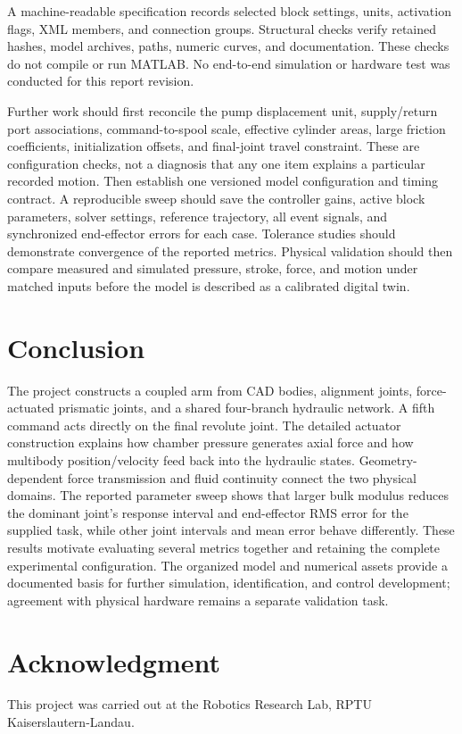 \documentclass[conference,letterpaper]{IEEEtran}
\begin{document}
A machine-readable specification records selected block settings, units, activation flags, XML members, and connection groups. Structural checks verify retained hashes, model archives, paths, numeric curves, and documentation. These checks do not compile or run MATLAB. No end-to-end simulation or hardware test was conducted for this report revision.

Further work should first reconcile the pump displacement unit, supply/return port associations, command-to-spool scale, effective cylinder areas, large friction coefficients, initialization offsets, and final-joint travel constraint. These are configuration checks, not a diagnosis that any one item explains a particular recorded motion. Then establish one versioned model configuration and timing contract. A reproducible sweep should save the controller gains, active block parameters, solver settings, reference trajectory, all event signals, and synchronized end-effector errors for each case. Tolerance studies should demonstrate convergence of the reported metrics. Physical validation should then compare measured and simulated pressure, stroke, force, and motion under matched inputs before the model is described as a calibrated digital twin.

\section{Conclusion}
The project constructs a coupled arm from CAD bodies, alignment joints, force-actuated prismatic joints, and a shared four-branch hydraulic network. A fifth command acts directly on the final revolute joint. The detailed actuator construction explains how chamber pressure generates axial force and how multibody position/velocity feed back into the hydraulic states. Geometry-dependent force transmission and fluid continuity connect the two physical domains. The reported parameter sweep shows that larger bulk modulus reduces the dominant joint's response interval and end-effector RMS error for the supplied task, while other joint intervals and mean error behave differently. These results motivate evaluating several metrics together and retaining the complete experimental configuration. The organized model and numerical assets provide a documented basis for further simulation, identification, and control development; agreement with physical hardware remains a separate validation task.

\section*{Acknowledgment}
This project was carried out at the Robotics Research Lab, RPTU Kaiserslautern-Landau.



\end{document}
